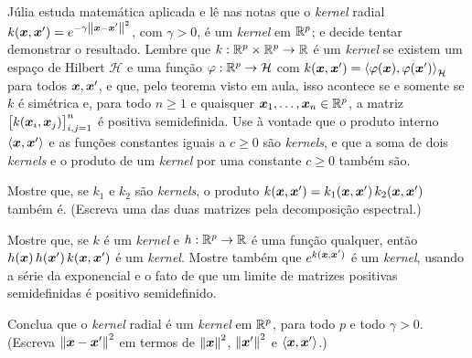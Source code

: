 Júlia estuda matemática aplicada e lê nas notas que o \emph{kernel} radial
$k(\bm{x},\bm{x}')=e^{-\gamma\left\lVert \bm{x}-\bm{x}' \right\rVert^2}$, com $\gamma>0$, é um \emph{kernel} em
$\mathbb{R}^p$; e decide tentar demonstrar o resultado. Lembre que $k:\mathbb{R}^p\times\mathbb{R}^p\to\mathbb{R}$ é um \emph{kernel} se existem um espaço de
Hilbert $\mathcal H$ e uma função $\varphi:\mathbb{R}^p\to\mathcal H$ com
$k(\bm{x},\bm{x}')=\left\langle \varphi(\bm{x}), \varphi(\bm{x}') \right\rangle_{\mathcal H}$ para todos $\bm{x},\bm{x}'$, e que, pelo
teorema visto em aula, isso acontece se e somente se $k$ é simétrica e, para todo $n\ge1$ e
quaisquer $\bm{x}_1,\dots,\bm{x}_n\in\mathbb{R}^p$, a matriz $\big[k(\bm{x}_i,\bm{x}_j)\big]_{i,j=1}^n$ é positiva
semidefinida. Use à vontade que o produto interno $\left\langle \bm{x}, \bm{x}' \right\rangle$ e as funções constantes
iguais a $c\ge0$ são \emph{kernels}, e que a soma de dois \emph{kernels} e o produto de um
\emph{kernel} por uma constante $c\ge0$ também são.
\begin{itens}
  \item {} Mostre que, se $k_1$ e $k_2$ são \emph{kernels}, o produto
        $k(\bm{x},\bm{x}')=k_1(\bm{x},\bm{x}')\,k_2(\bm{x},\bm{x}')$ também é. (Escreva uma das duas matrizes pela
        decomposição espectral.)
  \item {} Mostre que, se $k$ é um \emph{kernel} e $h:\mathbb{R}^p\to\mathbb{R}$ é uma função
        qualquer, então $h(\bm{x})\,h(\bm{x}')\,k(\bm{x},\bm{x}')$ é um \emph{kernel}. Mostre também que
        $e^{k(\bm{x},\bm{x}')}$ é um \emph{kernel}, usando a série da exponencial e o fato de que um
        limite de matrizes positivas semidefinidas é positivo semidefinido.
  \item {} Conclua que o \emph{kernel} radial é um \emph{kernel} em $\mathbb{R}^p$, para todo
        $p$ e todo $\gamma>0$. (Escreva $\left\lVert \bm{x}-\bm{x}' \right\rVert^2$ em termos de $\left\lVert \bm{x} \right\rVert^2$,
        $\left\lVert \bm{x}' \right\rVert^2$ e $\left\langle \bm{x}, \bm{x}' \right\rangle$.)
\end{itens}

